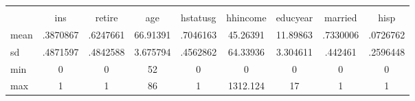 {
\def\sym#1{\ifmmode^{#1}\else\(^{#1}\)\fi}
\begin{tabular}{l*{1}{cccccccc}}
\hline\hline
            &\multicolumn{8}{c}{}                                                                                   \\
            &         ins&      retire&         age&    hstatusg&    hhincome&    educyear&     married&        hisp\\
\hline
mean        &    .3870867&    .6247661&    66.91391&    .7046163&    45.26391&    11.89863&    .7330006&    .0726762\\
sd          &    .4871597&    .4842588&    3.675794&    .4562862&    64.33936&    3.304611&     .442461&    .2596448\\
min         &           0&           0&          52&           0&           0&           0&           0&           0\\
max         &           1&           1&          86&           1&    1312.124&          17&           1&           1\\
\hline\hline
\end{tabular}
}
